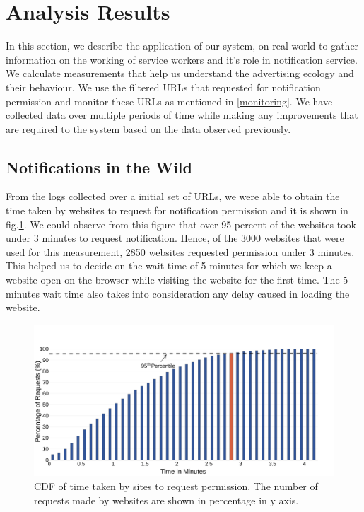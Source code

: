 \section{Analysis Results}
In this section, we describe the application of our system, \sysname on real world to gather information on the working of service workers and it's role in notification service. We calculate measurements that help us understand the advertising ecology and their behaviour. We use the filtered URLs that requested for notification permission and monitor these URLs as mentioned in \ref{monitoring}. We have collected data over multiple periods of time while making any improvements that are required to the system based on the data observed previously. 

\subsection{Notifications in the Wild}
From the logs collected over a initial set of URLs, we were able to obtain the time taken by websites to request for notification permission and it is shown in fig.\ref{req_time}. We could observe from this figure that over 95 percent of the websites took under 3 minutes to request notification. Hence, of the 3000 websites that were used for this measurement, 2850 websites requested permission under 3 minutes. This helped us to decide on the wait time of 5 minutes for which we keep a website open on the browser while visiting the website for the first time. The 5 minutes wait time also takes into consideration any delay caused in loading the website. 

\begin{figure}[h]
\includegraphics[width=\columnwidth]{figs/req_time.pdf}
\caption{CDF of time taken by sites to request permission. The number of requests made by websites are shown in percentage in y axis. }
\label{req_time}
\end{figure}

